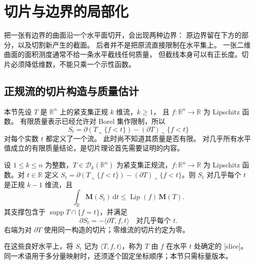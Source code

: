 \section{切片与边界的局部化}
\label{b1:sec:D104}

把一张有边界的曲面沿一个水平面切开，会出现两种边界：
原边界留在下方的部分，以及切割新产生的截面。
后者并不是把原流直接限制在水平集上。
一张二维曲面的面积测度通常不给一条水平截线任何质量，
但截线本身可以有正长度。切片必须降低维数，不能只乘一个示性函数。

\subsection{正规流的切片构造与质量估计}
\label{b1:subsec:D10401}

本节先设 \(T\) 是 \(\mathbb R^n\) 上的紧支集正规 \(k\) 维流，\(k\geq1\)，
且 \(f:\mathbb R^n\rightarrow\mathbb R\) 为 Lipschitz 函数。
有限质量表示已经允许对 Borel 集作限制，所以
\[
 S_t=\partial(T\llcorner\{f<t\})
             -(\partial T)\llcorner\{f<t\}
\]
对每个实数 \(t\) 都定义了一个流。
此时尚不知道其质量是否有限。
对几乎所有水平值成立的有限质量结论，是切片理论首先需要证明的内容。

\begin{theorem}\label{b1:thm:app-d-normal-slicing}
设 \(1\le k\le n\) 为整数，\(T\in\mathcal D_k(\mathbb R^n)\) 为紧支集正规流，\(f:\mathbb R^n\to\mathbb R\) 为 Lipschitz 函数。对 \(t\in\mathbb R\) 定义 \(S_t=\partial(T\llcorner\{f<t\})-(\partial T)\llcorner\{f<t\}\)。则 \(S_t\) 对几乎每个 \(t\) 是正规 \(k-1\) 维流，且
\[
 \int_{\mathbb R}\mathbf M(S_t)\,\mathrm{d}t
       \leq\operatorname{Lip}(f)\,\mathbf M(T).
\]
其支撑包含于 \(\operatorname{supp}T\cap\{f=t\}\)，并满足
\[
 \partial S_t=-\langle\partial T,f,t\rangle
 \quad\text{对几乎每个 }t.
\]
右端为对 \(\partial T\) 使用同一构造的切片；零维流的切片约定为零。
\end{theorem}

在这些良好水平上，将 \(S_t\) 记为 \(\langle T,f,t\rangle\)，称为 \(T\)
由 \(f\) 在水平 \(t\) 处确定的%
[slice]。
同一术语用于多分量映射时，还须逐个固定坐标顺序；本节只需标量版本。

